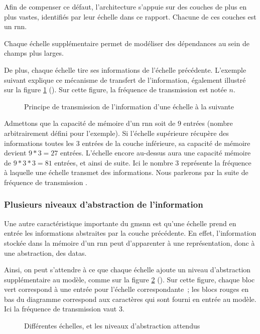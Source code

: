{Afin de compenser ce défaut, l'architecture  s'appuie sur des couches de plus en plus vastes, identifiés par leur échelle dans ce rapport.
Chacune de ces couches est un \gls{rnn}.

Chaque échelle supplémentaire permet de modéliser des dépendances au sein de champs plus larges.

De plus, chaque échelle tire ses informations de l'échelle précédente.
L'exemple suivant explique ce mécanisme de transfert de l'information, également illustré sur la figure \ref{fig:gmsnn_transmit} (). Sur cette figure, la fréquence de transmission est notée $n$.

\begin{figure}[ht]
	\centering
	
	\caption{Principe de transmission de l'information d'une échelle à la suivante}
	\label{fig:gmsnn_transmit}
\end{figure}

Admettons que la capacité de mémoire d'un \gls{rnn} soit de $9$ entrées (nombre arbitrairement défini pour l'exemple).
Si l'échelle supérieure récupère des informations toutes les $3$ entrées de la couche inférieure, sa capacité de mémoire devient $9*3=27$ entrées.
L'échelle encore au-dessus aura une capacité mémoire de  $9*3*3=81$ entrées, et ainsi de suite.
Ici le nombre $3$ représente la fréquence à laquelle une échelle transmet des informations. Nous parlerons par la suite de \og fréquence de transmission \fg{}.

\subsubsection{Plusieurs niveaux d'abstraction de l'information}
Une autre caractéristique importante du \gls{gmsnn} est qu'une échelle prend en entrée les informations abstraites par la couche précédente. En effet, l'information stockée dans la mémoire d'un \gls{rnn} peut d'apparenter à une représentation, donc à une abstraction, des \glspl{data}.

Ainsi, on peut s'attendre à ce que chaque échelle ajoute un niveau d'abstraction supplémentaire au modèle, comme sur la figure \ref{fig:gmsnn_ms} ().
Sur cette figure, chaque bloc vert correspond à une entrée pour l'échelle correspondante~; les blocs rouges en bas du diagramme correspond aux caractères qui sont fourni en entrée au modèle.
Ici la fréquence de transmission vaut 3.

\begin{figure}[ht]
	\centering
	
	\caption{%
		Différentes échelles, et les niveaux d'abstraction attendus}
	\label{fig:gmsnn_ms}
\end{figure}


}
